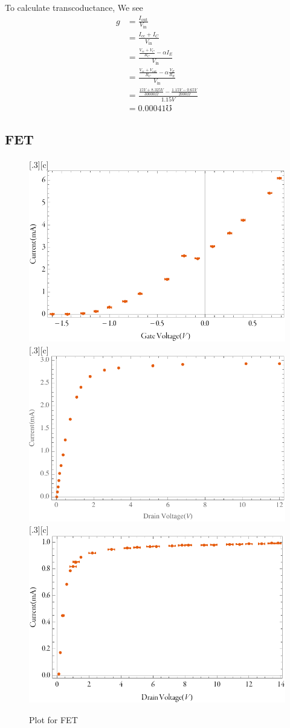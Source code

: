 \documentclass[aps,prl,reprint]{revtex4-1}
\newcommand{\vcc}{V_\text{cc}}
\begin{document}
To calculate transcoductance, We see
\begin{align*}
    g &= \frac{I_\text{out}}{V_\text{in}} \\
      &= \frac{I_\text{cc} + I_C}{V_\text{in}}\\
      &= \frac{\frac{\vcc + V_C}{R_C} - \alpha I_E}{V_\text{in}} \\
      &= \frac{\frac{\vcc + V_\text{out}}{R_C} - \alpha \frac{V_E}{R_E}}{V_\text{in}}\\
      &= \frac{\frac{15V + 8.325V}{30000\Omega} - \frac{1.15V - 0.65V}{2000\Omega}}{1.15V}\\
      &= 0.00041\mho
\end{align*}

\subsection{FET}

    \begin{figure}[t!]
    \centering
    [.3\linewidth][c]{%
        \includegraphics[width=.3\linewidth]{image/ivvg.pdf}}\quad
    [.3\linewidth][c]{%
        \includegraphics[width=.3\linewidth]{image/lvvdg0.pdf}}\quad
    [.3\linewidth][c]{%
        \includegraphics[width=.3\linewidth]{image/ivvdgn.pdf}}
    \caption{Plot for FET}
    \label{fig:fetPlot}
    \end{figure}
\end{document}
